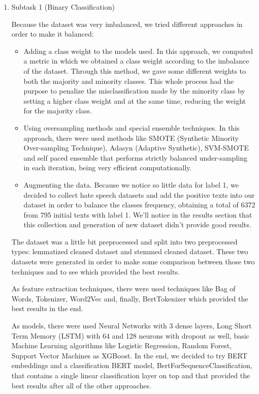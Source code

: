 \documentclass[11pt]{article}
\begin{document}
\begin{enumerate}

\item Subtask 1 (Binary Classification)

Because the dataset was very imbalanced, we tried different approaches in
order to make it balanced:

\begin{itemize}
    \item Adding a class weight to the models used. In this approach, we
    computed a metric in which we obtained a class weight according to the
    imbalance of the dataset. Through this method, we gave some different
    weights to both the majority and minority classes. This whole process had
    the purpose to penalize the misclassification made by the minority class by
    setting a higher class weight and at the same time, reducing the weight for
    the majority class.

    \item Using oversampling methods and special ensemble techniques. In this
    approach, there were used methods like SMOTE (Synthetic Minority
    Over-sampling Technique), Adasyn (Adaptive Synthetic), SVM-SMOTE and self
    paced ensemble that performs strictly balanced under-sampling in each
    iteration, being very efficient computationally.

    \item Augmenting the data. Because we notice so little data for label 1, we
    decided to collect hate speech datasets and add the positive texts into our
    dataset in order to balance the classes frequency, obtaining a total of 6372
    from 795 initial texts with label 1. We'll notice in the results section
    that this collection and generation of new dataset didn't provide good
    results.
\end{itemize}

The dataset was a little bit preprocessed and split into two preprocessed
types: lemmatized cleaned dataset and stemmed cleaned dataset. These two
datasets were generated in order to make some comparison between those two
techniques and to see which provided the best results.

As feature extraction techniques, there were used techniques like Bag of
Words, Tokenizer, Word2Vec and, finally, BertTokenizer which provided the
best results in the end.

As models, there were used Neural Networks with 3 dense layers, Long Short
Term Memory (LSTM) with 64 and 128 neurons with dropout as well, basic
Machine Learning algorithms like Logistic Regression, Random Forest, Support
Vector Machines as XGBoost. In the end, we decided to try BERT embeddings
and a classification BERT model, BertForSequenceClassification, that
contains a single linear classification layer on top and that provided the
best results after all of the other approaches.


\end{enumerate}
\end{document}
